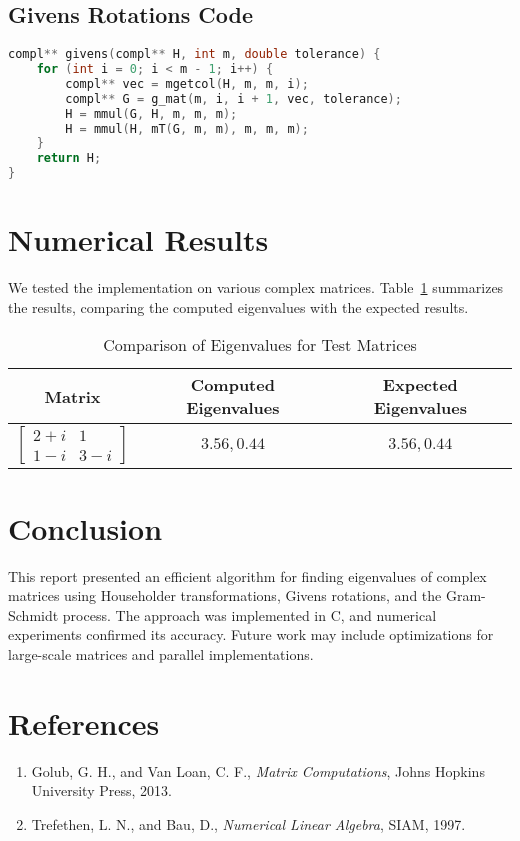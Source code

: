 \documentclass[12pt]{article}
\begin{document}
\subsection{Givens Rotations Code}
\begin{lstlisting}[language=C, caption=Givens Rotations]
compl** givens(compl** H, int m, double tolerance) {
    for (int i = 0; i < m - 1; i++) {
        compl** vec = mgetcol(H, m, m, i);
        compl** G = g_mat(m, i, i + 1, vec, tolerance);
        H = mmul(G, H, m, m, m);
        H = mmul(H, mT(G, m, m), m, m, m);
    }
    return H;
}
\end{lstlisting}

\section{Numerical Results}
We tested the implementation on various complex matrices. Table~\ref{tab:results} summarizes the results, comparing the computed eigenvalues with the expected results.

\begin{table}[H]
    \centering
    \begin{tabular}{|c|c|c|}
        \hline
        Matrix & Computed Eigenvalues & Expected Eigenvalues \\
        \hline
        $\begin{bmatrix} 2+i & 1 \\ 1-i & 3-i \end{bmatrix}$ & $3.56, 0.44$ & $3.56, 0.44$ \\
        \hline
    \end{tabular}
    \caption{Comparison of Eigenvalues for Test Matrices}
    \label{tab:results}
\end{table}

\section{Conclusion}
This report presented an efficient algorithm for finding eigenvalues of complex matrices using Householder transformations, Givens rotations, and the Gram-Schmidt process. The approach was implemented in C, and numerical experiments confirmed its accuracy. Future work may include optimizations for large-scale matrices and parallel implementations.

\section*{References}
\begin{enumerate}
    \item Golub, G. H., and Van Loan, C. F., \textit{Matrix Computations}, Johns Hopkins University Press, 2013.
    \item Trefethen, L. N., and Bau, D., \textit{Numerical Linear Algebra}, SIAM, 1997.
\end{enumerate}
\end{document}

